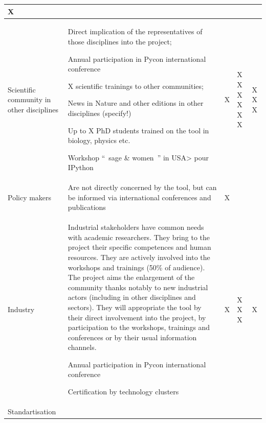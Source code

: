 \begin{flushleft}
\begin{supertabular}{|m{2cm}|m{8cm}|l|l|l|}
X\\\hline
Scientific community in other disciplines &
\begin{compactenum}
\item Direct implication of the representatives of those disciplines
into the project;\item Annual participation in Pycon international
conference\item X scientific trainings to other communities; \item News
in Nature and other editions in other disciplines (specify!)\item Up to
X PhD students trained on the tool in biology, physics etc.\item
Workshop ``~sage \& women~'' in USA{\textgreater} pour
IPython
\end{compactenum}
 &
X
 &
X
X
X
X
X
X
 &
X
X
X\\\hline
Policy makers &
Are not directly concerned by the tool, but can be informed via
international conferences and publications &
X &
 &
\\\hline
Industry &
\begin{compactenum}
\item Industrial stakeholders have common needs with academic
researchers. They bring to the project their specific competences and
human resources. They are actively involved into the workshops and
trainings (50\% of audience). The project aims the enlargement of the
community thanks notably to new industrial actors (including in other
disciplines and sectors). They will appropriate the tool by their
direct involvement into the project, by participation to the workshops,
trainings and conferences or by their usual information channels.\item
Annual participation in Pycon international conference\item
Certification by technology clusters
\end{compactenum}
 &
X &
X
X
X
 &
X\\\hline
Standartisation


\end{supertabular}
\end{flushleft}
